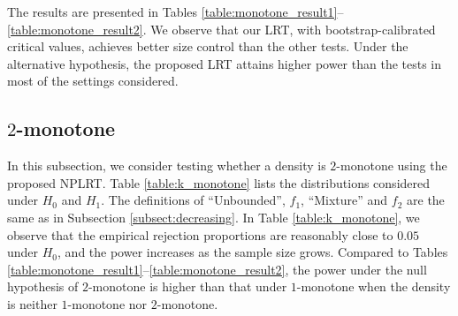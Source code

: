 \documentclass[12pt,letterpaper, twoside, openany]{article}
\theoremstyle{plain}
\begin{document}
{%

}


The results are presented in Tables \ref{table:monotone_result1}--\ref{table:monotone_result2}. We observe that our LRT, with bootstrap-calibrated critical values, achieves better size control than the other tests. Under the alternative hypothesis, the proposed LRT attains higher power than the  tests in most of the settings considered. 


\subsection{$2$-monotone}
In this subsection, we consider testing whether a density is $2$-monotone using the proposed NPLRT. Table \ref{table:k_monotone} lists the distributions considered under $H_0$ and $H_1$. The definitions of ``Unbounded'', $f_1$, ``Mixture'' and $f_2$ are the same as in Subsection \ref{subsect:decreasing}. In Table \ref{table:k_monotone},  we observe that the empirical rejection proportions are reasonably close to $0.05$ under $H_0$, and the power increases as the sample size grows. Compared to Tables \ref{table:monotone_result1}--\ref{table:monotone_result2}, the power under the null hypothesis of $2$-monotone is higher than that under $1$-monotone when the density is neither $1$-monotone nor $2$-monotone.
\end{document}
